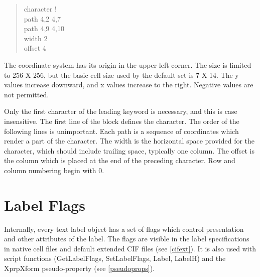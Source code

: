 \begin{quote}\vt
character !\\
path 4,2 4,7\\
path 4,9 4,10\\
width 2\\
offset 4\\
\end{quote}

The coordinate system has its origin in the upper left corner.  The
size is limited to 256 X 256, but the basic cell size used by the
default set is 7 X 14.  The y values increase downward, and x values
increase to the right.  Negative values are not permitted.

Only the first character of the leading keyword is necessary, and this
is case insensitive.  The first line of the block defines the
character.  The order of the following lines is unimportant.  Each
path is a sequence of coordinates which render a part of the
character.  The {\vt width} is the horizontal space provided for the
character, which should include trailing space, typically one column. 
The {\vt offset} is the column which is placed at the end of the
preceding character.  Row and column numbering begin with 0.

 
\section{Label Flags}
\label{labelflags}

Internally, every {\Xic} text label object has a set of flags which
control presentation and other attributes of the label.  The flags are
visible in the label specifications in native cell files and default
extended CIF files (see \ref{cifext}).  It is also used with script
functions ({\vt GetLabelFlags}, {\vt SetLabelFlags}, {\vt Label}, {\vt
LabelH}) and the {\et XprpXform} pseudo-property (see
\ref{pseudoprops}).

